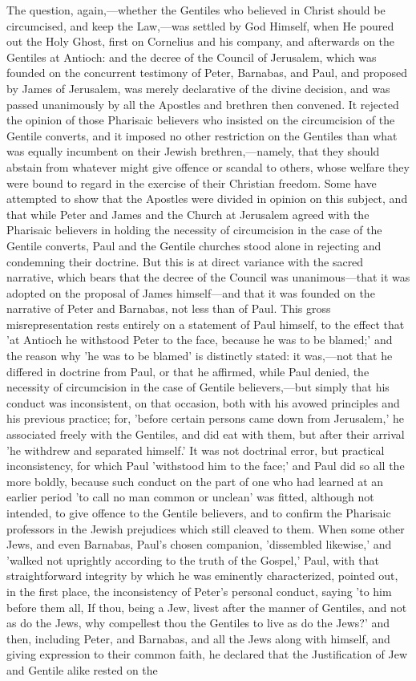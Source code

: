 \documentclass[
]{book}
\begin{document}
The question, again,---whether the Gentiles who believed in Christ should be circumcised, and keep the Law,---was settled by God Himself, when He poured out the Holy Ghost, first on Cornelius and his company, and afterwards on the Gentiles at Antioch: and the decree of the Council of Jerusalem, which was founded on the concurrent testimony of Peter, Barnabas, and Paul, and proposed by James of Jerusalem, was merely declarative of the divine decision, and was passed unanimously by all the Apostles and brethren then convened. It rejected the opinion of those Pharisaic believers who insisted on the circumcision of the Gentile converts, and it imposed no other restriction on the Gentiles than what was equally incumbent on their Jewish brethren,---namely, that they should abstain from whatever might give offence or scandal to others, whose welfare they were bound to regard in the exercise of their Christian freedom. Some have attempted to show that the Apostles were divided in opinion on this subject, and that while Peter and James and the Church at Jerusalem agreed with the Pharisaic believers in holding the necessity of circumcision in the case of the Gentile converts, Paul and the Gentile churches stood alone in rejecting and condemning their doctrine. But this is at direct variance with the sacred narrative, which bears that the decree of the Council was unanimous---that it was adopted on the proposal of James himself---and that it was founded on the narrative of Peter and Barnabas, not less than of Paul. This gross misrepresentation rests entirely on a statement of Paul himself, to the effect that 'at Antioch he withstood Peter to the face, because he was to be blamed;' and the reason why 'he was to be blamed' is distinctly stated: it was,---not that he differed in doctrine from Paul, or that he affirmed, while Paul denied, the necessity of circumcision in the case of Gentile believers,---but simply that his conduct was inconsistent, on that occasion, both with his avowed principles and his previous practice; for, 'before certain persons came down from Jerusalem,' he associated freely with the Gentiles, and did eat with them, but after their arrival 'he withdrew and separated himself.' It was not doctrinal error, but practical inconsistency, for which Paul 'withstood him to the face;' and Paul did so all the more boldly, because such conduct on the part of one who had learned at an earlier period 'to call no man common or unclean' was fitted, although not intended, to give offence to the Gentile believers, and to confirm the Pharisaic professors in the Jewish prejudices which still cleaved to them. When some other Jews, and even Barnabas, Paul's chosen companion, 'dissembled likewise,' and 'walked not uprightly according to the truth of the Gospel,' Paul, with that straightforward integrity by which he was eminently characterized, pointed out, in the first place, the inconsistency of Peter's personal conduct, saying 'to him before them all, If thou, being a Jew, livest after the manner of Gentiles, and not as do the Jews, why compellest thou the Gentiles to live as do the Jews?' and then, including Peter, and Barnabas, and all the Jews along with himself, and giving expression to their common faith, he declared that the Justification of Jew and Gentile alike rested on the 
\end{document}
